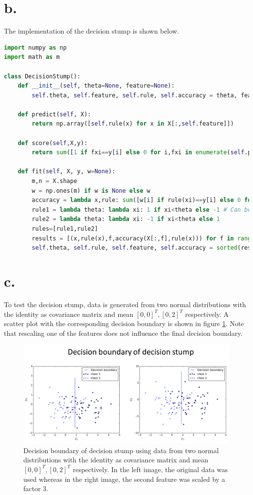 \documentclass [a4paper] {report}
\begin{document}
	\section*{b.}
	The implementation of the decision stump is shown below.
	
	\begin{lstlisting}[language=python, frame=l, basicstyle=\ttfamily\scriptsize]
import numpy as np
import math as m

class DecisionStump():
	def __init__(self, theta=None, feature=None):
		self.theta, self.feature, self.rule, self.accuracy = theta, feature, None, None
	
	def predict(self, X):
		return np.array([self.rule(x) for x in X[:,self.feature]])
	
	def score(self,X,y):
		return sum([1 if fxi==y[i] else 0 for i,fxi in enumerate(self.predict(X))])/y.shape[0]
	
	def fit(self, X, y, w=None):
		m,n = X.shape
		w = np.ones(m) if w is None else w
		accuracy = lambda x,rule: sum([w[i] if rule(xi)==y[i] else 0 for (i,xi) in enumerate(x)])/sum(w)
		rule1 = lambda theta: lambda xi: 1 if xi<theta else -1 # Can be partially applied
		rule2 = lambda theta: lambda xi: -1 if xi<theta else 1
		rules=[rule1,rule2]
		results = [(x,rule(x),f,accuracy(X[:,f],rule(x))) for f in range(0,n) for rule in rules for x in X[:,f]]
		self.theta, self.rule, self.feature, self.accuracy = sorted(results,key=lambda tup:tup[3])[-1]
	\end{lstlisting}
	
	\section*{c.}
	To test the decision stump, data is generated from two normal distributions with the identity as covariance matrix and mean $[0,0]^{T}, [0,2]^{T}$ respectively. A scatter plot with the corresponding decision boundary is shown in figure \ref{fig:scatter}. Note that rescaling one of the features does not influence the final decision boundary.
	
	\begin{figure}[H]
		\includegraphics[width = \textwidth]{Images/scatter.png}
		\caption{Decision boundary of decision stump using data from two normal distributions with the identity as covariance matrix and mean $[0,0]^{T}, [0,2]^{T}$ respectively. In the left image, the original data was used whereas in the right image, the second feature was scaled by a factor $3$.}
		\label{fig:scatter}
	\end{figure}
	
\end{document}
